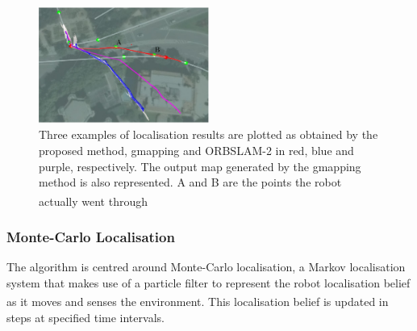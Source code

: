 \documentclass[11pt]{article}		%
\newcommand{\supercite}[1]{\textsuperscript{\cite{#1}}}		%
\begin{document}
	   \begin{figure}[h]
			\centering
			\includegraphics[width=0.5\textwidth]{localisationalgocomparison.jpg}
			\caption{Three examples of localisation results are plotted as obtained by the proposed method, gmapping and ORBSLAM-2 in red, blue and purple, respectively. The output map generated by the gmapping method is also represented. A and B are the points the robot actually went through\supercite{ELFTransmitter}}
			\label{localisationExamples}
		\end{figure}
		
		\subsubsection{Monte-Carlo Localisation}
		                		
		\begin{floatingfigure}[r]{0pt} \end{floatingfigure}
	    The algorithm is centred around Monte-Carlo localisation, a Markov localisation system that makes use of a particle filter to represent the robot localisation belief as it moves and senses the environment\supercite{montecarlo}. This localisation belief is updated in steps at specified time intervals. 
        
\end{document}
